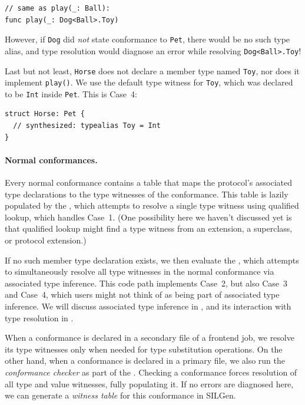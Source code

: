 \documentclass[../generics]{subfiles}
\begin{document}
\begin{example}
\begin{Verbatim}
// same as play(_: Ball):
func play(_: Dog<Ball>.Toy)
\end{Verbatim}
However, if \texttt{Dog} did \emph{not} state conformance to \texttt{Pet}, there would be no such type alias, and type resolution would diagnose an error while resolving \texttt{Dog<Ball>.Toy}!

Last but not least, \texttt{Horse} does not declare a member type named \texttt{Toy}, nor does it implement \texttt{play()}. We use the default type witness for \texttt{Toy}, which was declared to be \texttt{Int} inside \texttt{Pet}. This is Case~4:
\begin{Verbatim}
struct Horse: Pet {
  // synthesized: typealias Toy = Int
}
\end{Verbatim}
\end{example}

\paragraph{Normal conformances.}
Every normal conformance contains a table that maps the protocol's associated type declarations to the type witnesses of the conformance. This table is lazily populated by the , which attempts to resolve a single type witness using qualified lookup, which handles Case~1. (One possibility here we haven't discussed yet is that qualified lookup might find a type witness from an extension, a superclass, or protocol extension.)

If no such member type declaration exists, we then evaluate the , which attempts to simultaneously resolve all type witnesses in the normal conformance via associated type inference. This code path implements Case~2, but also Case~3 and Case~4, which users might not think of as being part of associated type inference. We will discuss associated type inference in , and its interaction with type resolution in .

When a conformance is declared in a secondary file of a frontend job, we resolve its type witnesses only when needed for type substitution operations. On the other hand, when a conformance is declared in a primary file, we also run the \emph{conformance checker} as part of the . Checking a conformance forces resolution of all type and value witnesses, fully populating it. If no errors are diagnosed here, we can generate a \emph{witness table} for this conformance in SILGen.
\end{document}
